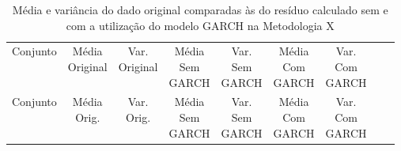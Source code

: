 \clearpage

\begin{center}
\begin{longtable}{ccccccccc}
\toprule
\rowcolor{white}
\caption[Metodologia X: dados estatísticos]{Média e variância do dado original
comparadas às do resíduo calculado sem e com a utilização do modelo GARCH na
Metodologia X} \label{tab:DadosEstatisticosMet10}\\
\midrule
    Conjunto & \specialcell{Média\\Original} &
    \specialcell{Var.\\Original} & \specialcell{Média\\Sem\\GARCH} &
    \specialcell{Var.\\Sem\\GARCH} & \specialcell{Média\\Com\\GARCH}&
    \specialcell{Var.\\Com\\GARCH} \\

\midrule
\endfirsthead 
\midrule
\rowcolor{white}
    Conjunto & \specialcell{Média\\Orig.} &
    \specialcell{Var.\\Orig.} & \specialcell{Média\\Sem\\GARCH} &
    \specialcell{Var.\\Sem\\GARCH} & \specialcell{Média\\Com\\GARCH}&
    \specialcell{Var.\\Com\\GARCH} \\


\end{longtable}
\end{center}
